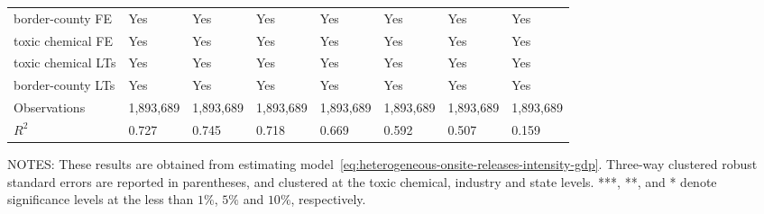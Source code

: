 \begin{table}[H]
{\begin{tabular}{@{}llllllll@{}}
            border-county FE                & Yes       & Yes           & Yes       & Yes          & Yes             & Yes           & Yes                 \\
            toxic chemical FE               & Yes       & Yes           & Yes       & Yes          & Yes             & Yes           & Yes                 \\
            toxic chemical LTs              & Yes       & Yes           & Yes       & Yes          & Yes             & Yes           & Yes                 \\
            border-county LTs               & Yes       & Yes           & Yes       & Yes          & Yes             & Yes           & Yes                 \\\midrule
            Observations                    & 1,893,689 & 1,893,689     & 1,893,689 & 1,893,689    & 1,893,689       & 1,893,689     & 1,893,689           \\
            $R^2$                           & 0.727     & 0.745         & 0.718     & 0.669        & 0.592           & 0.507         & 0.159               \\ \bottomrule \bottomrule
        \end{tabular}%
    }
    \begin{minipage}{\columnwidth}
        \vspace{0.05in}
        \tiny NOTES: These results are obtained from estimating model~\ref{eq:heterogeneous-onsite-releases-intensity-gdp}. Three-way clustered robust standard errors are reported in parentheses, and clustered at the toxic chemical, industry and state levels. ***, **, and * denote significance levels at the less than $1\%$, $5\%$ and $10\%$, respectively.
    \end{minipage}
\end{table}